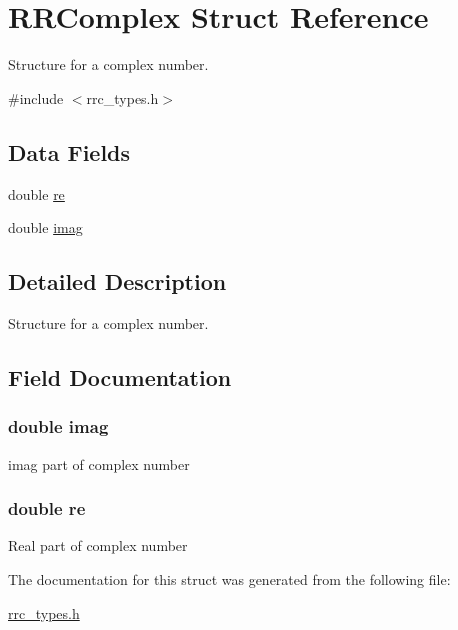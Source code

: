 \hypertarget{struct_r_r_complex}{\section{R\+R\+Complex Struct Reference}
\label{struct_r_r_complex}
}


Structure for a complex number.  




{\ttfamily \#include $<$rrc\+\_\+types.\+h$>$}

\subsection*{Data Fields}
\begin{DoxyCompactItemize}
\item 
double \hyperlink{struct_r_r_complex_a5a6fce2fc5cae153945fea2c45beeb4f}{re}
\item 
double \hyperlink{struct_r_r_complex_a9aace20780eedccdde9fe2352ee4fb05}{imag}
\end{DoxyCompactItemize}


\subsection{Detailed Description}
Structure for a complex number. 

\subsection{Field Documentation}
\hypertarget{struct_r_r_complex_a9aace20780eedccdde9fe2352ee4fb05}{
\subsubsection[{imag}]{\setlength{\rightskip}{0pt plus 5cm}double imag}}\label{struct_r_r_complex_a9aace20780eedccdde9fe2352ee4fb05}
imag part of complex number \hypertarget{struct_r_r_complex_a5a6fce2fc5cae153945fea2c45beeb4f}{
\subsubsection[{re}]{\setlength{\rightskip}{0pt plus 5cm}double re}}\label{struct_r_r_complex_a5a6fce2fc5cae153945fea2c45beeb4f}
Real part of complex number 

The documentation for this struct was generated from the following file\+:\begin{DoxyCompactItemize}
\item 
\hyperlink{rrc__types_8h}{rrc\+\_\+types.\+h}\end{DoxyCompactItemize}
